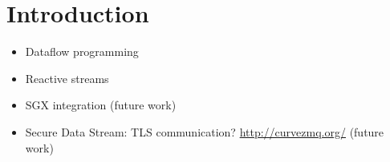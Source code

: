 \section{Introduction}
\label{sec:introduction}

\begin{itemize}
  \item Dataflow programming
  \item Reactive streams
  \item SGX integration (future work)
  \item Secure Data Stream: TLS communication? \url{http://curvezmq.org/} (future work)
\end{itemize}
